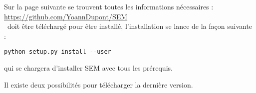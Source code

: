 \documentclass[manual-fr.tex]{subfiles}
\begin{document}
Sur la page suivante se trouvent toutes les informations nécessaires :\\

\url{https://github.com/YoannDupont/SEM} \\

\SEM\ doit être téléchargé pour être installé, l'installation se lance de la façon suivante :

\begin{lstlisting}[style=pieceofcode,frame=single]
python setup.py install --user
\end{lstlisting}

qui se chargera d'installer SEM avec tous les prérequis.

Il existe deux possibilités pour télécharger la dernière version.
\end{document}
